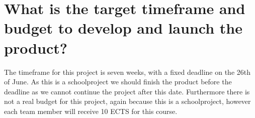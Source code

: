 \section{What is the target timeframe and budget to develop and launch the product?}
The timeframe for this project is seven weeks, with a fixed deadline on the 26th of June.
As this is a schoolproject we should finish the product before the deadline as we cannot continue the project after this date.
Furthermore there is not a real budget for this project, again because this is a schoolproject, however each team member will receive 10 ECTS for this course.
